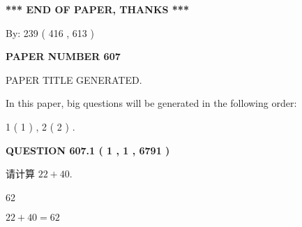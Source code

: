 \documentclass{ctexart}
\begin{document}
   
   
   
\vspace{1.0in} 
{\textbf{\large{ *** END OF PAPER, THANKS *** }}} 
   
   
\hspace{1.0in} By: 
 239 ( 416 ,  613 )
   
   
   
   
\newpage 
\setcounter{page}{ 
   607001 } 
   
   
   
   
 {\textbf{ \Large{ PAPER NUMBER  607  }}}
   
   
\vspace{0.2in}
   
   
   
   
   
   
   
   
 \vspace{0.2in}
 
 
 
 
   
   
 PAPER TITLE GENERATED.
   
   
   
\vspace{0.2in}
   
In this paper, big questions will be generated in the following order: 
   
   
   1 ( 1 )
 ,
   2 ( 2 )
 .
  
\vspace{0.2in}
  
{\textbf{\Large{QUESTION
607.1 
 ( 1 , 1 , 6791 )
}}}
  
  
 
请计算 $ %
22 +  %
40 $.
 
 
 
\noindent{}
 
 

62
 
 
\noindent{}
 
 

 
 
 
\noindent{}
 
 

$ %
22 +  %
40=   %
62$
 
\end{document}
